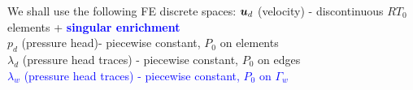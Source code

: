 We shall use the following FE discrete spaces:
$\mathbf{\boldsymbol{u}}_d$ (velocity) - discontinuous $RT_0$ elements + \textcolor{blue}{\bf singular enrichment}\\
$p_d$ (pressure head)- piecewise constant, $P_0$ on elements \\
$\lambda_d$ (pressure head traces) - piecewise constant, $P_0$ on edges \\
\textcolor{blue}{$\lambda_w$ (pressure head traces) - piecewise constant, $P_0$ on $\Gamma_w$}




% 
% 
% 



